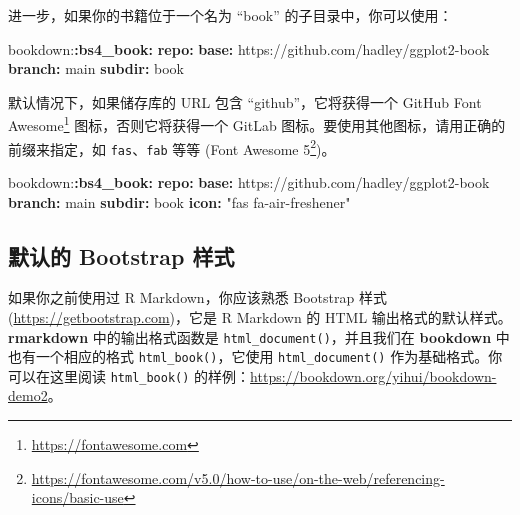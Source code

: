 \documentclass[
  12pt,
]{krantz}
\newenvironment{Shaded}{\begin{snugshade}}{\end{snugshade}}
\newcommand{\AttributeTok}[1]{\textcolor[rgb]{0.13,0.29,0.53}{#1}}
\newcommand{\FunctionTok}[1]{\textcolor[rgb]{0.13,0.29,0.53}{\textbf{#1}}}
\newcommand{\KeywordTok}[1]{\textcolor[rgb]{0.13,0.29,0.53}{\textbf{#1}}}
\newcommand{\StringTok}[1]{\textcolor[rgb]{0.31,0.60,0.02}{#1}}
\renewcommand{\href}[2]{#2\footnote{\url{#1}}}
\theoremstyle{definition}
\theoremstyle{definition}
\theoremstyle{definition}
\theoremstyle{definition}
\theoremstyle{remark}
\begin{document}
进一步，如果你的书籍位于一个名为 ``book'' 的子目录中，你可以使用：

\begin{Shaded}
\begin{Highlighting}[]
\AttributeTok{bookdown:}\FunctionTok{:bs4\_book}\KeywordTok{:}
\AttributeTok{  }\FunctionTok{repo}\KeywordTok{:}
\AttributeTok{    }\FunctionTok{base}\KeywordTok{:}\AttributeTok{ https://github.com/hadley/ggplot2{-}book}
\AttributeTok{    }\FunctionTok{branch}\KeywordTok{:}\AttributeTok{ main}
\AttributeTok{    }\FunctionTok{subdir}\KeywordTok{:}\AttributeTok{ book}
\end{Highlighting}
\end{Shaded}

默认情况下，如果储存库的 URL 包含 ``github''，它将获得一个 GitHub \href{https://fontawesome.com}{Font Awesome} 图标，否则它将获得一个 GitLab 图标。要使用其他图标，请用正确的前缀来指定，如 \texttt{fas}、\texttt{fab} 等等 (\href{https://fontawesome.com/v5.0/how-to-use/on-the-web/referencing-icons/basic-use}{Font Awesome 5})。

\begin{Shaded}
\begin{Highlighting}[]
\AttributeTok{bookdown:}\FunctionTok{:bs4\_book}\KeywordTok{:}
\AttributeTok{  }\FunctionTok{repo}\KeywordTok{:}
\AttributeTok{    }\FunctionTok{base}\KeywordTok{:}\AttributeTok{ https://github.com/hadley/ggplot2{-}book}
\AttributeTok{    }\FunctionTok{branch}\KeywordTok{:}\AttributeTok{ main}
\AttributeTok{    }\FunctionTok{subdir}\KeywordTok{:}\AttributeTok{ book}
\AttributeTok{    }\FunctionTok{icon}\KeywordTok{:}\AttributeTok{ }\StringTok{"fas fa{-}air{-}freshener"}
\end{Highlighting}
\end{Shaded}

\hypertarget{bootstrap-style}{%
\subsection{默认的 Bootstrap 样式}\label{bootstrap-style}}

如果你之前使用过 R Markdown，你应该熟悉 Bootstrap 样式 (\url{https://getbootstrap.com})，它是 R Markdown 的 HTML 输出格式的默认样式。\textbf{rmarkdown} 中的输出格式函数是 \texttt{html\_document()}，并且我们在 \textbf{bookdown} 中也有一个相应的格式 \texttt{html\_book()}，它使用 \texttt{html\_document()} 作为基础格式。你可以在这里阅读 \texttt{html\_book()} 的样例：\url{https://bookdown.org/yihui/bookdown-demo2}。
\end{document}
